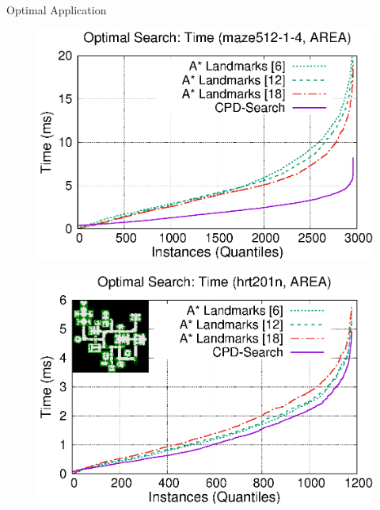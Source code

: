 \begin{frame}{Optimal Application}
    \begin{adjustwidth}{-2.5em}{-2.5em}
        \begin{minipage}{0.59\textwidth}
            \begin{figure}
                \centering
                \includegraphics[width=1.0\textwidth]{src/images/optimal/maze512-1-4}
                \label{fig:optimal-maze512-1-4}
            \end{figure}
        \end{minipage}%
        \begin{minipage}{0.59\textwidth}
            \begin{figure}
                \centering
                \includegraphics[width=1.0\textwidth]{src/images/optimal/hrt201n}
                \label{fig:optimal-hrt201n}
            \end{figure}
        \end{minipage}
    \end{adjustwidth}
\end{frame}

